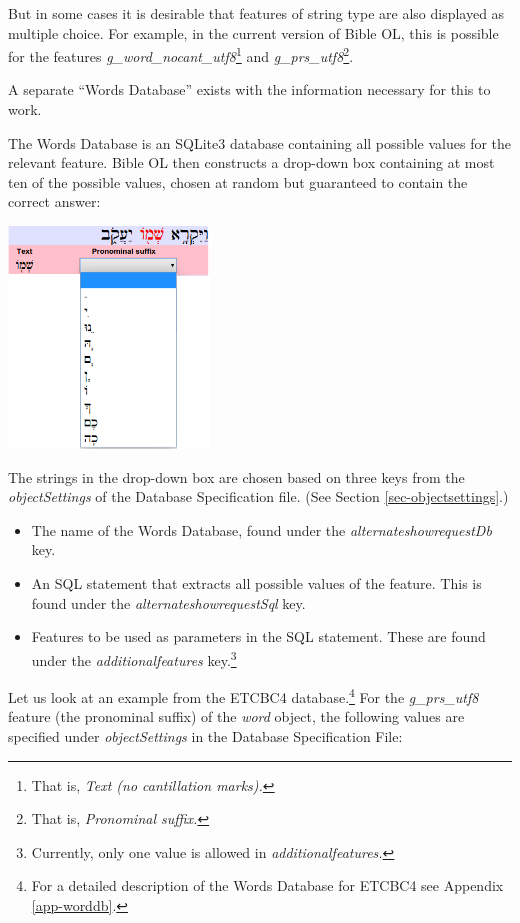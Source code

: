 \documentclass[11pt,oneside,a4paper]{memoir}
\begin{document}
But in some cases it is desirable that features of string type are also displayed as multiple
choice. For example, in the current version of Bible OL, this is possible for the features
\emph{g\_word\_nocant\_utf8}\footnote{That is, \emph{Text (no cantillation marks).}} and
\emph{g\_prs\_utf8}\footnote{That is, \emph{Pronominal suffix.}}.

A separate ``Words Database'' exists with the information necessary for this to work.

The Words Database is an SQLite3 database containing all possible values for the relevant feature.
Bible OL then constructs a drop-down box containing at most ten of the possible values, chosen at
random but guaranteed to contain the correct answer:

\begin{center}
  \includegraphics[width=0.4\textwidth]{pronsuf.png}
\end{center}

The strings in the drop-down box are chosen based on three keys from the \emph{objectSettings} of
the Database Specification file. (See Section \ref{sec-objectsettings}.)

\begin{itemize}
\item The name of the Words Database, found under the \emph{alternateshowrequestDb} key.
\item An SQL statement that extracts all possible values of the feature. This is found under the
  \emph{alternateshowrequestSql} key.
\item Features to be used as parameters in the SQL statement. These are found under the
  \emph{additionalfeatures} key.\footnote{Currently, only one value is allowed in \emph{additionalfeatures.}}
\end{itemize}


Let us look at an example from the ETCBC4 database.\footnote{For a detailed description of the Words
Database for ETCBC4 see Appendix \ref{app-worddb}.} For the \emph{g\_prs\_utf8} feature (the
pronominal suffix) of the \emph{word} object, the following values are specified under
\emph{objectSettings} in the Database Specification File:
\end{document}
